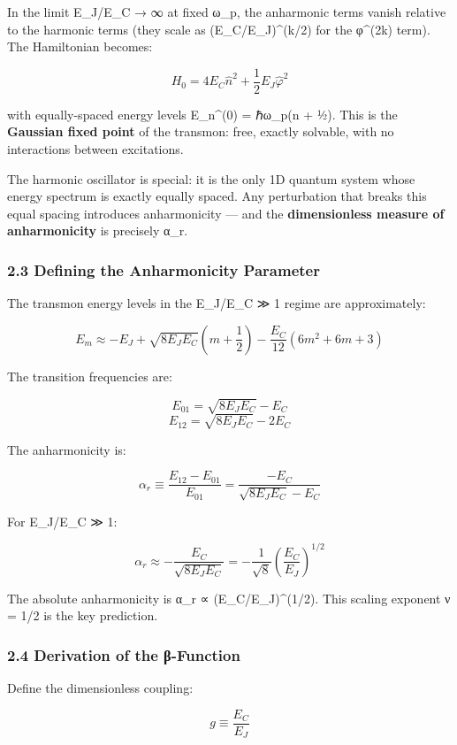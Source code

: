 \documentclass[
]{article}
\begin{document}
In the limit E\_J/E\_C → ∞ at fixed ω\_p, the anharmonic terms vanish
relative to the harmonic terms (they scale as (E\_C/E\_J)\^{}(k/2) for
the φ\^{}(2k) term). The Hamiltonian becomes:

\[H_0 = 4E_C\hat{n}^2 + \frac{1}{2}E_J\hat{\varphi}^2\]

with equally-spaced energy levels E\_n\^{}(0) = ℏω\_p(n + ½). This is
the \textbf{Gaussian fixed point} of the transmon: free, exactly
solvable, with no interactions between excitations.

The harmonic oscillator is special: it is the only 1D quantum system
whose energy spectrum is exactly equally spaced. Any perturbation that
breaks this equal spacing introduces anharmonicity --- and the
\textbf{dimensionless measure of anharmonicity} is precisely α\_r.

\subsubsection{2.3 Defining the Anharmonicity
Parameter}\label{defining-the-anharmonicity-parameter}

The transmon energy levels in the E\_J/E\_C ≫ 1 regime are
approximately:

\[E_m \approx -E_J + \sqrt{8E_JE_C}\left(m + \frac{1}{2}\right) - \frac{E_C}{12}(6m^2 + 6m + 3)\]

The transition frequencies are:

\[E_{01} = \sqrt{8E_JE_C} - E_C\] \[E_{12} = \sqrt{8E_JE_C} - 2E_C\]

The anharmonicity is:

\[\alpha_r \equiv \frac{E_{12} - E_{01}}{E_{01}} = \frac{-E_C}{\sqrt{8E_JE_C} - E_C}\]

For E\_J/E\_C ≫ 1:

\[\alpha_r \approx -\frac{E_C}{\sqrt{8E_JE_C}} = -\frac{1}{\sqrt{8}}\left(\frac{E_C}{E_J}\right)^{1/2}\]

The absolute anharmonicity is \textbar α\_r\textbar{} ∝
(E\_C/E\_J)\^{}(1/2). This scaling exponent ν = 1/2 is the key
prediction.

\subsubsection{2.4 Derivation of the
β-Function}\label{derivation-of-the-ux3b2-function}

Define the dimensionless coupling:

\[g \equiv \frac{E_C}{E_J}\]
\end{document}
